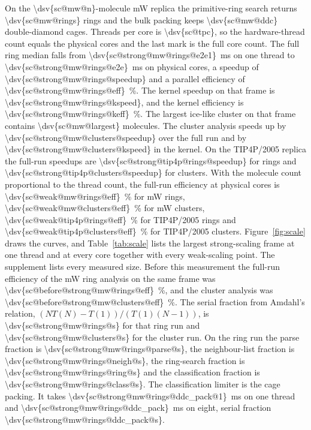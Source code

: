 \documentclass[preprint,12pt]{elsarticle}
\begin{document}
On the \num{\dsv{sc@mw@n}}-molecule mW replica the primitive-ring search returns \num{\dsv{sc@mw@rings}} rings and the bulk packing keeps \num{\dsv{sc@mw@ddc}} double-diamond cages.
Threads per core is \num{\dsv{sc@tpc}}, so the hardware-thread count equals the  physical cores and the last mark is the full core count.
The full ring median falls from \qty{\dsv{sc@strong@mw@rings@e2e1}}{\milli\second} on one thread to \qty{\dsv{sc@strong@mw@rings@e2e}}{\milli\second} on  physical cores, a speedup of \num{\dsv{sc@strong@mw@rings@speedup}} and a parallel efficiency of \qty{\dsv{sc@strong@mw@rings@eff}}{\percent}.
The kernel speedup on that frame is \num{\dsv{sc@strong@mw@rings@kspeed}}, and the kernel efficiency is \qty{\dsv{sc@strong@mw@rings@keff}}{\percent}.
The largest ice-like cluster on that frame contains \num{\dsv{sc@mw@largest}} molecules.
The cluster analysis speeds up by \num{\dsv{sc@strong@mw@clusters@speedup}} over the full run and by \num{\dsv{sc@strong@mw@clusters@kspeed}} in the kernel.
On the TIP4P/2005 replica the full-run speedups are \num{\dsv{sc@strong@tip4p@rings@speedup}} for rings and \num{\dsv{sc@strong@tip4p@clusters@speedup}} for clusters.
With the molecule count proportional to the thread count, the full-run efficiency at  physical cores is \qty{\dsv{sc@weak@mw@rings@eff}}{\percent} for mW rings, \qty{\dsv{sc@weak@mw@clusters@eff}}{\percent} for mW clusters, \qty{\dsv{sc@weak@tip4p@rings@eff}}{\percent} for TIP4P/2005 rings and \qty{\dsv{sc@weak@tip4p@clusters@eff}}{\percent} for TIP4P/2005 clusters.
Figure~\ref{fig:scale} draws the curves, and Table~\ref{tab:scale} lists the largest strong-scaling frame at one thread and at every core together with every weak-scaling point.
The supplement lists every measured size.
Before this measurement the full-run efficiency of the mW ring analysis on the same frame was \qty{\dsv{sc@before@strong@mw@rings@eff}}{\percent}, and the cluster analysis was \qty{\dsv{sc@before@strong@mw@clusters@eff}}{\percent}.
The serial fraction from Amdahl's relation, $(N T(N) - T(1)) / (T(1) (N - 1))$, is \num{\dsv{sc@strong@mw@rings@s}} for that ring run and \num{\dsv{sc@strong@mw@clusters@s}} for the cluster run.
On the ring run the parse fraction is \num{\dsv{sc@strong@mw@rings@parse@s}}, the neighbour-list fraction is \num{\dsv{sc@strong@mw@rings@neigh@s}}, the ring-search fraction is \num{\dsv{sc@strong@mw@rings@ring@s}} and the classification fraction is \num{\dsv{sc@strong@mw@rings@class@s}}.
The classification limiter is the cage packing.
It takes \qty{\dsv{sc@strong@mw@rings@ddc_pack@1}}{\milli\second} on one thread and \qty{\dsv{sc@strong@mw@rings@ddc_pack}}{\milli\second} on eight, serial fraction \num{\dsv{sc@strong@mw@rings@ddc_pack@s}}.
\end{document}
